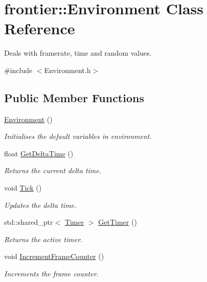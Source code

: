 \hypertarget{classfrontier_1_1_environment}{}\section{frontier\+:\+:Environment Class Reference}
\label{classfrontier_1_1_environment}


Deals with framerate, time and random values.  




{\ttfamily \#include $<$Environment.\+h$>$}

\subsection*{Public Member Functions}
\begin{DoxyCompactItemize}
\item 
\hyperlink{classfrontier_1_1_environment_a5134f0589b326bb3ca0dad342c11b8f4}{Environment} ()
\begin{DoxyCompactList}\small\item\em Initialises the default variables in environment. \end{DoxyCompactList}\item 
float \hyperlink{classfrontier_1_1_environment_a145406fce70fa4231bba0da2cb7fe0d7}{Get\+Delta\+Time} ()
\begin{DoxyCompactList}\small\item\em Returns the current delta time. \end{DoxyCompactList}\item 
void \hyperlink{classfrontier_1_1_environment_a56c69f8866517b1dd93976690c869710}{Tick} ()
\begin{DoxyCompactList}\small\item\em Updates the delta time. \end{DoxyCompactList}\item 
std\+::shared\+\_\+ptr$<$ \hyperlink{classfrontier_1_1_timer}{Timer} $>$ \hyperlink{classfrontier_1_1_environment_a1e5a50e5f54b908516a24b02672ebab0}{Get\+Timer} ()
\begin{DoxyCompactList}\small\item\em Returns the active timer. \end{DoxyCompactList}\item 
void \hyperlink{classfrontier_1_1_environment_a8cc8f5708b26f9366e620d13bb031e42}{Increment\+Frame\+Counter} ()
\begin{DoxyCompactList}\small\item\em Increments the frame counter. \end{DoxyCompactList}\item 

\end{DoxyCompactItemize}
